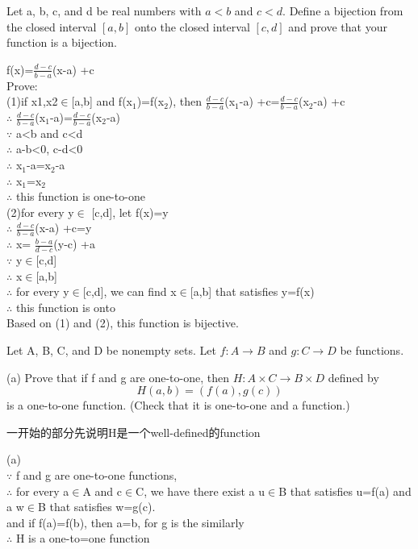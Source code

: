 \documentclass[11pt, a4paper, UTF8]{ctexart}
\begin{document}
\begin{problem}[UD:14.12]
Let a, b, c, and d be real numbers with \(a < b\) and \(c < d\). Define a bijection from the closed interval \([a,b]\) onto the closed interval \([c,d]\) and prove that your function is a bijection.
\end{problem}
\begin{revision}
f(x)=$\frac{d-c}{b-a}$(x-a) +c\\
Prove:\\
(1)if x1,x2$\in$[a,b] and f(x$_1$)=f(x$_2$), then $\frac{d-c}{b-a}$(x$_1$-a) +c=$\frac{d-c}{b-a}$(x$_2$-a) +c\\
$\therefore$ $\frac{d-c}{b-a}$(x$_1$-a)=$\frac{d-c}{b-a}$(x$_2$-a) \\
$\because$ a<b and c<d\\
$\therefore$ a-b<0, c-d<0\\
$\therefore$ x$_1$-a=x$_2$-a\\
$\therefore$ x$_1$=x$_2$\\
$\therefore$ this function is one-to-one\\
(2)for every y$\in$ [c,d], let f(x)=y\\
$\therefore$ $\frac{d-c}{b-a}$(x-a) +c=y\\
$\therefore$ x= $\frac{b-a}{d-c}$(y-c) +a\\
$\because$ y$\in$[c,d]\\
$\therefore$ x$\in$[a,b]\\
$\therefore$ for every y$\in$[c,d], we can find x$\in$[a,b] that satisfies y=f(x)\\
$\therefore$ this function is onto\\
Based on (1) and (2), this function is bijective.\\
\end{revision}


\begin{problem}[UD:15.14]
Let A, B, C, and D be nonempty sets. Let \(f:A \rightarrow B\) and \(g:C \rightarrow D\) be functions.

(a) Prove that if f and g are one-to-one, then \(H: A \times C \rightarrow B \times D\) defined by 
\[H(a,b) = (f(a),g(c))\]
is a one-to-one function. (Check that it is one-to-one and a function.)
\end{problem}
\begin{remark}
一开始的部分先说明H是一个well-defined的function
\end{remark}
\begin{revision}
(a) \\
$\because$ f and g are one-to-one functions, \\
$\therefore$ for every a$\in$A and c$\in$C, we have there exist a u$\in$B that satisfies u=f(a) and a w$\in$B that satisfies w=g(c).\\
and if f(a)=f(b), then a=b, for g is the similarly\\
$\therefore$ H is a one-to=one function\\
\end{revision}
\end{document}
